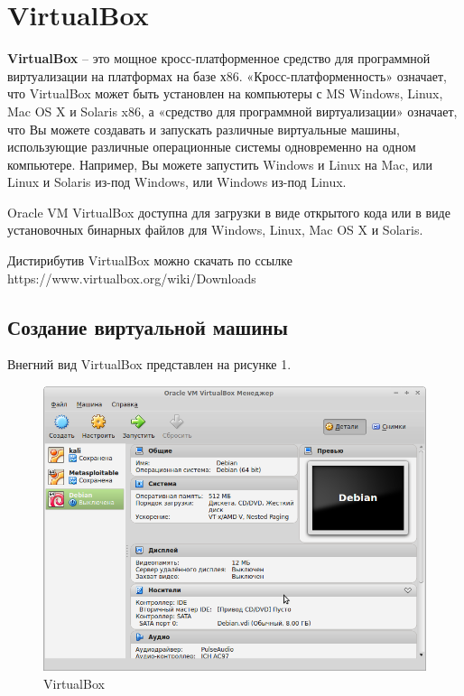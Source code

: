 \documentclass[12pt,a4paper]{article}
\begin{document}
\newpage
\tableofcontents
\newpage
\section{VirtualBox}
	\textbf{VirtualBox} – это мощное кросс-платформенное средство для программной виртуализации на платформах на базе х86. «Кросс-платформенность» означает, что VirtualBox может быть установлен на компьютеры с MS Windows, Linux, Mac OS X и Solaris x86, а «средство для программной виртуализации» означает, что Вы можете создавать и запускать различные виртуальные машины, использующие различные операционные системы одновременно на одном компьютере. Например, Вы можете запустить Windows и Linux на Mac, или Linux и Solaris из-под Windows, или Windows из-под Linux.

Oracle VM VirtualBox доступна для загрузки в виде открытого кода или в виде установочных бинарных файлов для Windows, Linux, Mac OS X и Solaris.

Дистирибутив VirtualBox можно скачать по ссылке https://www.virtualbox.org/wiki/Downloads
\subsection{Создание виртуальной машины}
Внегний вид VirtualBox представлен на рисунке 1.
\begin{figure}[h!]
\centering
\includegraphics[scale=0.5]{res/VirtualBox}
\caption{VirtualBox}
\end{figure}
\end{document}

